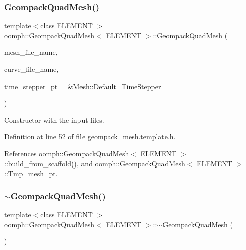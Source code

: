 \subsubsection{\texorpdfstring{Geompack\+Quad\+Mesh()}{GeompackQuadMesh()}}
{\footnotesize\ttfamily template$<$class E\+L\+E\+M\+E\+NT $>$ \\
\hyperlink{classoomph_1_1GeompackQuadMesh}{oomph\+::\+Geompack\+Quad\+Mesh}$<$ E\+L\+E\+M\+E\+NT $>$\+::\hyperlink{classoomph_1_1GeompackQuadMesh}{Geompack\+Quad\+Mesh} (\begin{DoxyParamCaption}\item[{const std\+::string \&}]{mesh\+\_\+file\+\_\+name,  }\item[{const std\+::string \&}]{curve\+\_\+file\+\_\+name,  }\item[{\hyperlink{classoomph_1_1TimeStepper}{Time\+Stepper} $\ast$}]{time\+\_\+stepper\+\_\+pt = {\ttfamily \&\hyperlink{classoomph_1_1Mesh_a12243d0fee2b1fcee729ee5a4777ea10}{Mesh\+::\+Default\+\_\+\+Time\+Stepper}} }\end{DoxyParamCaption})\hspace{0.3cm}{\ttfamily [inline]}}



Constructor with the input files. 



Definition at line 52 of file geompack\+\_\+mesh.\+template.\+h.



References oomph\+::\+Geompack\+Quad\+Mesh$<$ E\+L\+E\+M\+E\+N\+T $>$\+::build\+\_\+from\+\_\+scaffold(), and oomph\+::\+Geompack\+Quad\+Mesh$<$ E\+L\+E\+M\+E\+N\+T $>$\+::\+Tmp\+\_\+mesh\+\_\+pt.

\mbox{\label{classoomph_1_1GeompackQuadMesh_a7795c44ea2da182fbeffa30808481ffb}} 
\subsubsection{\texorpdfstring{$\sim$\+Geompack\+Quad\+Mesh()}{~GeompackQuadMesh()}}
{\footnotesize\ttfamily template$<$class E\+L\+E\+M\+E\+NT $>$ \\
\hyperlink{classoomph_1_1GeompackQuadMesh}{oomph\+::\+Geompack\+Quad\+Mesh}$<$ E\+L\+E\+M\+E\+NT $>$\+::$\sim$\hyperlink{classoomph_1_1GeompackQuadMesh}{Geompack\+Quad\+Mesh} (\begin{DoxyParamCaption}{ }\end{DoxyParamCaption})\hspace{0.3cm}{\ttfamily [inline]}}



